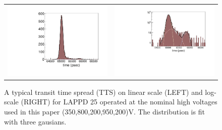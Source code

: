 \documentclass[preprint,12pt]{elsarticle}
\begin{document}
\begin{figure}
	\centering
        \begin{tabular}{l l}
                \includegraphics[width=0.42\linewidth]{plots/TTS_notlog} &
                \includegraphics[width=0.56\linewidth]{plots/TTS_log}\\
         \end{tabular}  
       \caption{A typical transit time spread (TTS) on linear scale (LEFT) and log-scale (RIGHT) for LAPPD 25 operated at the nominal high voltages used in this paper (350,800,200,950,200)V. The distribution is fit with three gausians.}
	\label{fig:crossbar}
\end{figure}




\end{document}

